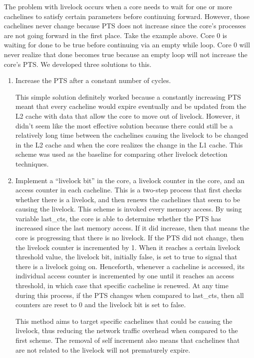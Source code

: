 \documentclass[12pt]{article}
\begin{document}
The problem with livelock occurs when a core needs to wait for one or more cachelines to satisfy certain parameters before continuing forward. However, those cachelines never change because PTS does not increase since the core’s processes are not going forward in the first place. Take  the example above. Core 0 is waiting for done to be true before continuing via an empty while loop. Core 0 will never realize that done becomes true because an empty loop will not increase the core’s PTS. We developed three solutions to this.

\begin{enumerate}
	\item       Increase the PTS after a constant number of cycles.
	
	This simple solution definitely worked because a constantly increasing PTS meant that every cacheline would expire eventually and be updated from the L2 cache with data that allow the core to move out of livelock. However, it didn’t seem like the most effective solution because there could still be a relatively long time between the cachelines causing the livelock to be changed in the L2 cache and when the core realizes the change in the L1 cache. This scheme was used as the baseline for comparing other livelock detection techniques.
	
	
	
	
	\item        Implement a “livelock bit” in the core, a livelock counter in the core, and an access counter in each cacheline. This is a two-step process that first checks whether there is a livelock, and then renews the cachelines that seem to be causing the livelock. This scheme is invoked every memory access. By using variable last\_cts, the core is able to determine whether the PTS has increased since the last memory access. If it did increase, then that means the core is progressing that there is no livelock. If the PTS did not change, then the livelock counter is incremented by 1. When it reaches a certain livelock threshold value, the livelock bit, initially false, is set to true to signal that there is a livelock going on. Henceforth, whenever a cacheline is accessed, its individual access counter is incremented by one until it reaches an access threshold, in which case that specific cacheline is renewed. At any time during this process, if the PTS changes when compared to last\_cts, then all counters are reset to 0 and the livelock bit is set to false.
	
	
	This method aims to target specific cachelines that could be causing the livelock, thus reducing the network traffic overhead when compared to the first scheme. The removal of self increment also means that cachelines that are not related to the livelock will not prematurely expire.
	

\end{enumerate}
\end{document}
